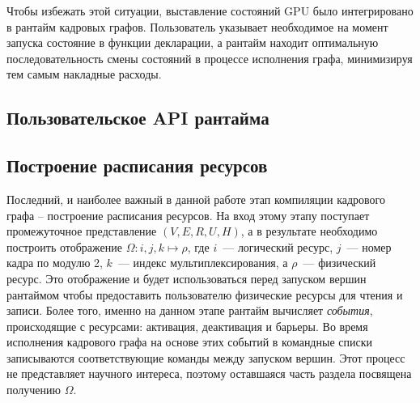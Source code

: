 Чтобы избежать этой ситуации, выставление состояний GPU было интегрировано в рантайм кадровых графов.
Пользователь указывает необходимое на момент запуска состояние в функции декларации, а рантайм находит оптимальную последовательность смены состояний в процессе исполнения графа, минимизируя тем самым накладные расходы.

\subsection{Пользовательское API рантайма}

\subsection{Построение расписания ресурсов}
Последний, и наиболее важный в данной работе этап компиляции кадрового графа -- построение расписания ресурсов.
На вход этому этапу поступает промежуточное представление $(V, E, R, U, H)$, а в результате необходимо построить отображение $\Omega : i, j, k \mapsto \rho$, где $i$~--- логический ресурс, $j$~--- номер кадра по модулю 2, $k$~--- индекс мультиплексирования, а $\rho$~--- физический ресурс.
Это отображение и будет использоваться перед запуском вершин рантаймом чтобы предоставить пользователю физические ресурсы для чтения и записи.
Более того, именно на данном этапе рантайм вычисляет \textit{события}, происходящие с ресурсами: активация, деактивация и барьеры.
Во время исполнения кадрового графа на основе этих событий в командные списки записываются соответствующие команды между запуском вершин.
Этот процесс не представляет научного интереса, поэтому оставшаяся часть раздела посвящена получению $\Omega$.

